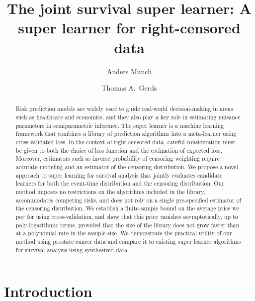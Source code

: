 \documentclass[alpha-refs]{wiley-article}
\title{The joint survival super learner: A super learner for right-censored
  data}
\author[1]{Anders Munch}
\author[1]{Thomas A.~Gerds}
\affil[1]{Section of Biostatistics, University of Copenhagen}
\newcommand{\1}{\mathds{1}}
\begin{document}
\maketitle

\begin{abstract}
  Risk prediction models are widely used to guide
  real-world decision-making in areas such as healthcare and
  economics, and they also play a key role in estimating nuisance
  parameters in semiparametric inference. The super learner is a
  machine learning framework that combines a library of prediction
  algorithms into a meta-learner using cross-validated loss. In the
  context of right-censored data, careful consideration must be given
  to both the choice of loss function and the estimation of expected
  loss.  Moreover, estimators such as inverse probability of censoring
  weighting require accurate modeling and an estimator of the
  censoring distribution. We propose a novel approach to super
  learning for survival analysis that jointly evaluates candidate
  learners for both the event-time distribution and the censoring
  distribution. Our method imposes no restrictions on the algorithms
  included in the library, accommodates competing risks, and does not
  rely on a single pre-specified estimator of the censoring
  distribution. We establish a finite-sample bound on the average
  price we pay for using cross-validation, and show that this price
  vanishes asymptotically, up to poly-logarithmic terms, provided that
  the size of the library does not grow faster than at a polynomial
  rate in the sample size. We demonstrate the practical utility of our
  method using prostate cancer data and compare it to existing super
  learner algorithms for survival analysis using synthesized data.

\end{abstract}


\section{Introduction}
\label{sec:introduction}
\end{document}

